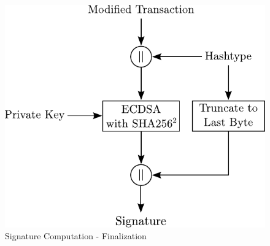 \begin{figure}[ht!]
 \centering
 \includegraphics[scale=0.9]{Images/Signature-Finalization.pdf}
 
 \vspace{5pt}
 \caption{Signature Computation - Finalization} \label{fig:SigFin-SighashAll}
\end{figure}